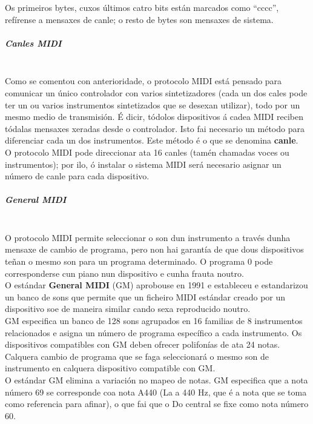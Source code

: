     Os primeiros bytes, cuxos últimos catro bits están marcados como ``cccc'',
    refírense a mensaxes de canle; o resto de bytes son mensaxes de sistema.

    \subparagraph{Canles MIDI}\mbox{}\\

    Como se comentou con anterioridade, o protocolo MIDI está pensado para
    comunicar un único controlador con varios sintetizadores (cada un dos cales
    pode ter un ou varios instrumentos sintetizados que se desexan utilizar),
    todo por un mesmo medio de transmisión. É dicir, tódolos dispositivos á
    cadea MIDI reciben tódalas mensaxes xeradas desde o controlador. Isto fai
    necesario un método para diferenciar cada un dos instrumentos. Este método
    é o que se denomina \textbf{canle}. \\

    O protocolo MIDI pode direccionar ata 16 canles (tamén chamadas voces ou
    instrumentos); por ilo, ó instalar o sistema MIDI será necesario asignar un
    número de canle para cada dispositivo.

    \subparagraph{General MIDI}\mbox{}\\

    O protocolo MIDI permite seleccionar o son dun instrumento a través dunha
    mensaxe de cambio de programa, pero non hai garantía de que dous
    dispositivos teñan o mesmo son para un programa determinado. O programa 0
    pode corresponderse cun piano nun dispositivo e cunha frauta noutro. \\

    O estándar \textbf{General MIDI} (GM) aprobouse en 1991 e estableceu e
    estandarizou un banco de sons que permite que un ficheiro MIDI estándar
    creado por un dispositivo soe de maneira similar cando sexa reproducido
    noutro. \\

    GM especifica un banco de 128 sons agrupados en 16 familias de 8
    instrumentos relacionados e asigna un número de programa específico a cada
    instrumento. Os dispositivos compatibles con GM deben ofrecer polifonías de
    ata 24 notas. Calquera cambio de programa que se faga seleccionará o mesmo
    son de instrumento en calquera dispositivo compatible con GM. \\

    O estándar GM elimina a variación no mapeo de notas. GM especifica que a
    nota número 69 se corresponde coa nota A440 (La a 440 Hz, que é a nota que
    se toma como referencia para afinar), o que fai que o Do central se fixe
    como nota número 60. \\

